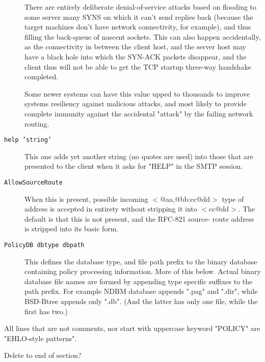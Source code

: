 \begin{description}
There are entirely deliberate denial-of-service attacks based on
flooding to some server many SYNS on which it can't send replies
back (because the target machines don't have network connectivity,
for example), and thus filling the back-queue of nascent sockets.
This can also happen accidentally, as the connectivity in between
the client host, and the server host may have a black hole into
which the SYN-ACK packets disappear, and the client thus will not
be able to get the TCP startup three-way handshake completed.

Some newer systems can have this value upped to thousands to
improve systems resiliency against malicious attacks, and most
likely to provide complete immunity against the accidental
"attack" by the failing network routing.



\item[{\tt help 'string'}] \mbox{}

This one adds yet another string (no quotes are used) into those
that are presented to the client when it asks for "HELP" in the
SMTP session.



\item[{\tt AllowSourceRoute}] \mbox{}

When this is present, possible incoming  {\(<\)}@aa,@bb:cc@dd{\(>\)}  type of
address is accepted in entirety without stripping it into {\(<\)}cc@dd{\(>\)}.
The default is that this is not present, and the RFC-821 source-
route address is stripped into its basic form.



\item[{\tt PolicyDB dbtype dbpath}] \mbox{}

This defines the database type, and file path prefix to the binary
database containing policy processing information.  More of this
below.  Actual binary database file names are formed by appending
type specific suffixes to the path prefix.  For example NDBM
database appends ".pag" and ".dir", while BSD-Btree appends only
".db".  (And the latter has only one file, while the first has two.)

\end{description}


All lines that are not comments, nor start with uppercase keyword
"POLICY" are "EHLO-style patterns".





Delete to end of section?


